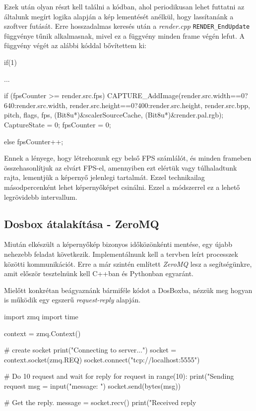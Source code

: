 Ezek után olyan részt kell találni a kódban, ahol periodikusan lehet futtatni az általunk megírt logika alapján a kép lementését anélkül, hogy lassítanánk a szoftver futását. Erre hosszadalmas keresés után a \textit{render.cpp} \verb|RENDER_EndUpdate| függvénye tűnik alkalmasnak, mivel ez a függvény minden frame végén lefut. 
A függvény végét az alábbi kóddal bővítettem ki:
\begin{cpp}

    if(1)
    {
        ...

        if (fpsCounter >= render.src.fps)
        {
            CAPTURE_AddImage(render.src.width==0?640:render.src.width, 
                             render.src.height==0?400:render.src.height, 
                             render.src.bpp, pitch,
                             flags, fps, (Bit8u*)&scalerSourceCache, 
                             (Bit8u*)&render.pal.rgb);
            CaptureState = 0;
            fpsCounter = 0;
        }
    
        else
        {
            fpsCounter++;
        } 
    }

    

\end{cpp}
Ennek a lényege, hogy létrehozunk egy belső FPS számlálót, és minden frameben összehasonlítjuk az elvárt FPS-el, amennyiben ezt elértük vagy túlhaladtunk rajta, lementjük a képernyő jelenlegi tartalmát.
Ezzel technikailag másodpercenként lehet képernyőképet csinálni. Ezzel a módszerrel ez a lehető legrövidebb intervallum.
\subsection{Dosbox átalakítása - ZeroMQ}

Miután elkészült a képernyőkép bizonyos időközönkénti mentése, egy újabb nehezebb feladat következik. Implementálnunk kell a tervben leírt processzek közötti kommunikációt. 
Erre a már szintén említett \textit{ZeroMQ} lesz a segítségünkre, amit először tesztelnünk kell C++ban és Pythonban egyaránt.

Mielőtt konkrétan beágyaznánk bármiféle kódot a DosBoxba, nézzük meg hogyan is működik egy egszerű \textit{request-reply} alapján.

\begin{python}

    import zmq
    import time

    context = zmq.Context()

    #  create socket
    print("Connecting to server...")
    socket = context.socket(zmq.REQ)
    socket.connect("tcp://localhost:5555")

    #  Do 10 request and wait for reply
    for request in range(10):
        print("Sending request %
        msg = input("message: ")
        socket.send(bytes(msg))

        
        #  Get the reply.
        message = socket.recv()
        print("Received reply %
\end{python}

